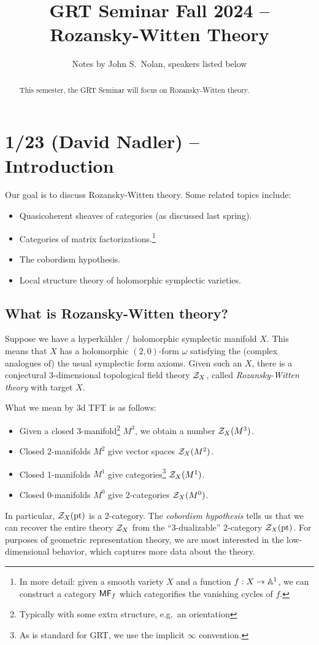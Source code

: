 \documentclass{article}
\title{GRT Seminar Fall 2024 -- Rozansky-Witten Theory}
\author{Notes by John S.\ Nolan, speakers listed below}
\begin{document}
\maketitle

\begin{abstract}
	This semester, the GRT Seminar will focus on Rozansky-Witten theory.
\end{abstract}

\tableofcontents

\section{1/23 (David Nadler) -- Introduction}

Our goal is to discuss Rozansky-Witten theory.
Some related topics include:
\begin{itemize}
	\item Quasicoherent sheaves of categories (as discussed last spring).
	\item Categories of matrix factorizations.\footnote{In more detail: given a smooth variety $X$ and a function $f: X \to \AA^1$, we can construct a category $\MF_f$ which categorifies the vanishing cycles of $f$.}
	\item The cobordism hypothesis.
	\item Local structure theory of holomorphic symplectic varieties.
\end{itemize}

\subsection{What is Rozansky-Witten theory?}

Suppose we have a hyperk\"ahler / holomorphic symplectic manifold $X$.
This means that $X$ has a holomorphic $(2, 0)$-form $\omega$ satisfying the (complex analogues of) the usual symplectic form axioms.
Given such an $X$, there is a conjectural 3-dimensional topological field theory $\Zc_X$, called \emph{Rozansky-Witten theory} with target $X$.

What we mean by 3d TFT is as follows:
\begin{itemize}
	\item Given a closed 3-manifold\footnote{Typically with some extra structure, e.g.\ an orientation} $M^3$, we obtain a number $\Zc_X(M^3)$.
	\item Closed 2-manifolds $M^2$ give vector spaces $\Zc_X(M^2)$.
	\item Closed 1-manifolds $M^1$ give categories\footnote{As is standard for GRT, we use the implicit $\infty$ convention.} $\Zc_X(M^1)$.
	\item Closed 0-manifolds $M^0$ give 2-categories $\Zc_X(M^0)$.
\end{itemize}
In particular, $\Zc_X(\pt)$ is a 2-category.
The \emph{cobordism hypothesis} tells us that we can recover the entire theory $\Zc_X$ from the ``3-dualizable'' 2-category $\Zc_X(\pt)$.
For purposes of geometric representation theory, we are most interested in the low-dimensional behavior, which captures more data about the theory.
\end{document}
